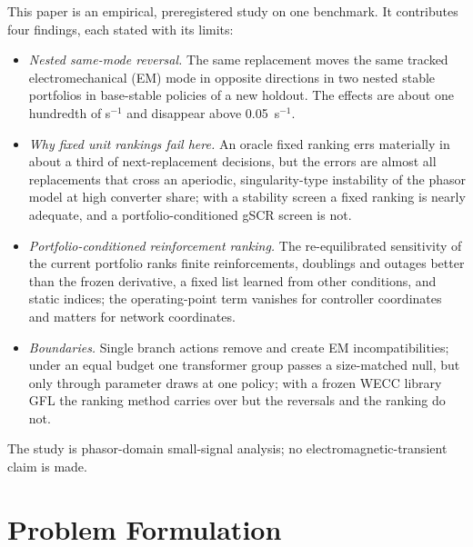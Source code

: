 \documentclass[journal]{IEEEtran}
\theoremstyle{remark}
\begin{document}
This paper is an empirical, preregistered study on one benchmark. It
contributes four findings, each stated with its limits:
\begin{itemize}
\item[C1)] \emph{Nested same-mode reversal.} The same replacement moves the same
tracked electromechanical (EM) mode in opposite directions in two nested stable
portfolios in \cntDNew{} base-stable policies of a new holdout. The effects are
about one hundredth of s$^{-1}$ and disappear above 0.05~s$^{-1}$.
\item[C2)] \emph{Why fixed unit rankings fail here.} An oracle fixed ranking
errs materially in about a third of next-replacement decisions, but the errors
are almost all replacements that cross an aperiodic, singularity-type instability
of the phasor model at high converter share; with a stability screen a fixed
ranking is nearly adequate, and a portfolio-conditioned gSCR screen is not.
\item[C3)] \emph{Portfolio-conditioned reinforcement ranking.} The re-equilibrated
sensitivity of the current portfolio ranks finite reinforcements, doublings and
outages better than the frozen derivative, a fixed list learned from other
conditions, and static indices; the operating-point term vanishes for controller
coordinates and matters for network coordinates.
\item[C4)] \emph{Boundaries.} Single branch actions remove and create EM
incompatibilities; under an equal budget one transformer group passes a
size-matched null, but only through parameter draws at one policy; with a frozen
WECC library GFL the ranking method carries over but the reversals and the
ranking do not.
\end{itemize}
The study is phasor-domain small-signal analysis; no electromagnetic-transient
claim is made.

\section{Problem Formulation}\label{sec:model}
\end{document}
